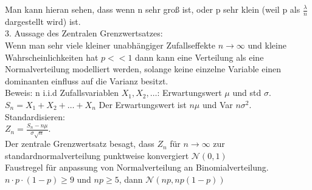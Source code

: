 \documentclass{article}
\begin{document}
	Man kann hieran sehen, dass wenn n sehr groß ist, oder p sehr klein (weil p als $\frac{\lambda}{n}$ dargestellt wird) ist.\\
	3. Aussage des Zentralen Grenzwertsatzes:\\
	Wenn man sehr viele kleiner unabhängiger Zufallseffekte $n\to\infty$ und kleine Wahrscheinlichkeiten hat $p<<1$ dann kann eine Verteilung als eine Normalverteilung modelliert werden, solange keine einzelne Variable einen dominanten einfluss auf die Varianz besitzt.\\
	Beweis: n i.i.d Zufallsvariablen $X_1,X_2,\dots$: Erwartungswert $\mu$ und std $\sigma$.\\
	$S_n = X_1+X_2+\dots+X_n$ Der Erwartungswert ist $n\mu$ und Var $n\sigma^2$. Standardisieren:\\
	$Z_n = \frac{S_n-n\mu}{\sigma\sqrt{n}}$.\\
	Der zentrale Grenzwertsatz besagt, dass $Z_n$ für $n\to\infty$ zur standardnormalverteilung punktweise konvergiert $\mathcal{N}(0,1)$\\
	Faustregel für anpassung von Normalverteilung an Binomialverteilung.\\
	$n\cdot p\cdot (1-p)\geq 9$ und $np\geq 5$, dann $\mathcal{N}(np, np(1-p))$\\
\end{document}
